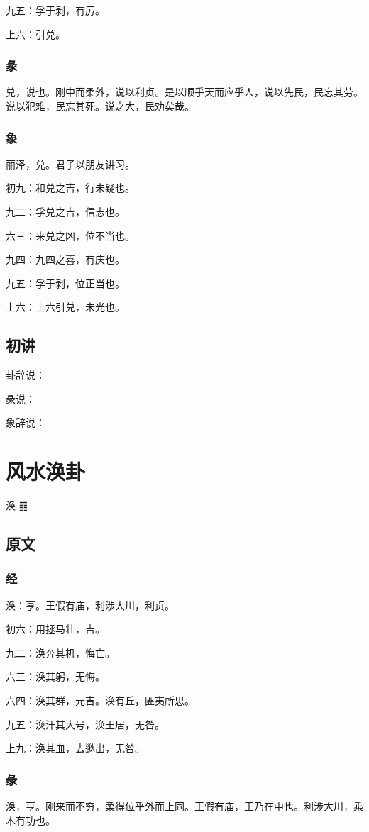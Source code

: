 \documentclass[12pt,oneside]{book}
\begin{document}
九五：孚于剥，有厉。

上六：引兑。

\subsection{彖}
兑，说也。刚中而柔外，说以利贞。是以顺乎天而应乎人，说以先民，民忘其劳。说以犯难，民忘其死。说之大，民劝矣哉。

\subsection{象}
丽泽，兑。君子以朋友讲习。

初九：和兑之吉，行未疑也。

九二：孚兑之吉，信志也。

六三：来兑之凶，位不当也。

九四：九四之喜，有庆也。

九五：孚于剥，位正当也。

上六：上六引兑，未光也。

\section{初讲}
卦辞说：

彖说：

象辞说：

\chapter{风水涣卦}
涣 {\Large ䷺}

\section{原文}

\subsection{经}
涣：亨。王假有庙，利涉大川，利贞。

初六：用拯马壮，吉。

九二：涣奔其机，悔亡。

六三：涣其躬，无悔。

六四：涣其群，元吉。涣有丘，匪夷所思。

九五：涣汗其大号，涣王居，无咎。

上九：涣其血，去逖出，无咎。

\subsection{彖}
涣，亨。刚来而不穷，柔得位乎外而上同。王假有庙，王乃在中也。利涉大川，乘木有功也。
\end{document}
